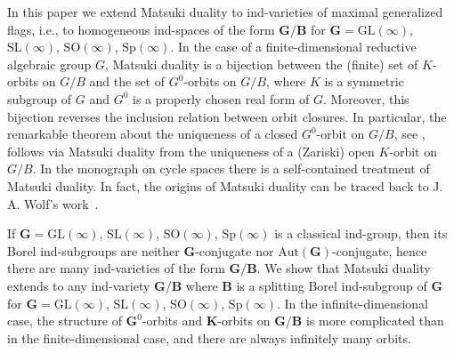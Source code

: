 \documentclass{amsart}
\theoremstyle{definition}
\begin{document}
In this paper we extend Matsuki duality to ind-varieties of maximal generalized flags, i.e., to homogeneous ind-spaces of the form $\mathbf{G}/\mathbf{B}$ for $\mathbf{G}=\mathrm{GL}(\infty)$, $\mathrm{SL}(\infty)$, $\mathrm{SO}(\infty)$, $\mathrm{Sp}(\infty)$.  In the case of a finite-dimensional reductive algebraic group $G$, Matsuki duality \cite{Gindikin-Matsuki, Matsuki, Matsuki3} is a bijection between the (finite) set of $K$-orbits on $G/B$ and the set of $G^0$-orbits on $G/B$, where $K$ is a symmetric subgroup of $G$ and $G^0$ is a properly chosen real form of $G$.  Moreover, this bijection reverses the inclusion relation between orbit closures.  In particular, the remarkable theorem about the uniqueness of a closed $G^0$-orbit on $G/B$, see \cite{W1}, follows via Matsuki duality from the uniqueness of a (Zariski) open $K$-orbit on $G/B$.
In the monograph \cite{FHW} on cycle spaces there is a self-contained treatment of Matsuki duality.  In fact, the origins of Matsuki duality can be traced back to J. A. Wolf's work~\cite{W1}.

If $\mathbf{G}=\mathrm{GL}(\infty)$, $\mathrm{SL}(\infty)$, $\mathrm{SO}(\infty)$, $\mathrm{Sp}(\infty)$ is a classical ind-group, then its Borel ind-subgroups are neither $\mathbf{G}$-conjugate nor $\mathrm{Aut}(\mathbf{G})$-conjugate, hence there are many ind-varieties of the form $\mathbf{G}/\mathbf{B}$.  We show that Matsuki duality extends to any ind-variety $\mathbf{G}/\mathbf{B}$ where $\mathbf{B}$ is a splitting Borel ind-subgroup of $\mathbf{G}$ for $\mathbf{G}=\mathrm{GL}(\infty)$, $\mathrm{SL}(\infty)$, $\mathrm{SO}(\infty)$, $\mathrm{Sp}(\infty)$.  In the infinite-dimensional case, the structure of $\mathbf{G}^0$-orbits and $\mathbf{K}$-orbits on $\mathbf{G}/\mathbf{B}$ is more complicated than in the finite-dimensional case, and there are always infinitely many orbits.  
\end{document}
